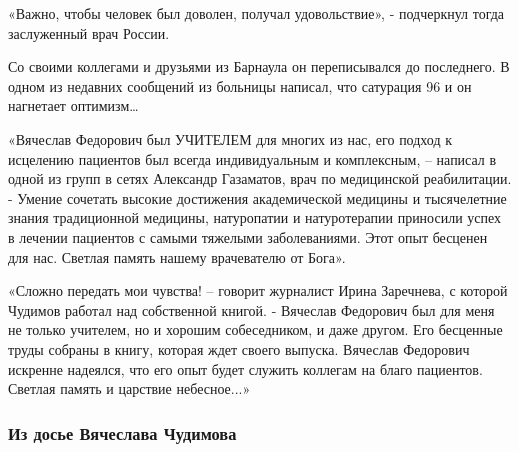 «Важно, чтобы человек был доволен, получал удовольствие», - подчеркнул тогда
заслуженный врач России.

Со своими коллегами и друзьями из Барнаула он переписывался до последнего. В
одном из недавних сообщений из больницы написал, что сатурация 96 и он
нагнетает оптимизм…

«Вячеслав Федорович был УЧИТЕЛЕМ для многих из нас, его подход к исцелению
пациентов был всегда индивидуальным и комплексным, – написал в одной из групп в
сетях Александр Газаматов, врач по медицинской реабилитации. - Умение сочетать
высокие достижения академической медицины и тысячелетние знания традиционной
медицины, натуропатии и натуротерапии приносили успех в лечении пациентов с
самыми тяжелыми заболеваниями. Этот опыт бесценен для нас. Светлая память
нашему врачевателю от Бога».

«Сложно передать мои чувства! – говорит журналист Ирина Заречнева, с которой
Чудимов работал над собственной книгой. - Вячеслав Федорович был для меня не
только учителем, но и хорошим собеседником, и даже другом. Его бесценные труды
собраны в книгу, которая ждет своего выпуска. Вячеслав Федорович искренне
надеялся, что его опыт будет служить коллегам на благо пациентов. Светлая
память и царствие небесное...»

\subsubsection{Из досье Вячеслава Чудимова}

